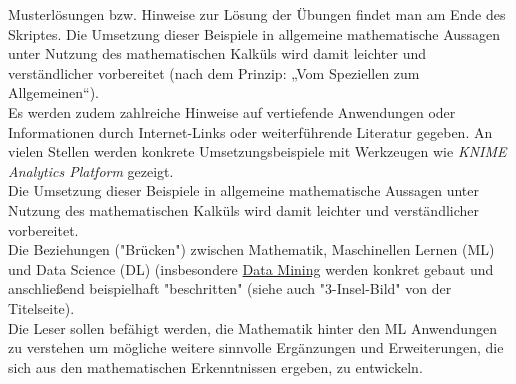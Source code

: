 \documentclass[12pt]{article}
\begin{document}
Musterlösungen bzw. Hinweise zur Lösung der Übungen findet man am Ende des Skriptes. Die Umsetzung dieser Beispiele in allgemeine mathematische Aussagen unter Nutzung des mathematischen Kalküls wird damit leichter und verständlicher vorbereitet (nach dem Prinzip: „Vom Speziellen zum Allgemeinen“). \\[0.1cm]
Es werden zudem zahlreiche Hinweise auf vertiefende Anwendungen oder Informationen durch Internet-Links oder weiterführende Literatur gegeben. An vielen Stellen werden konkrete Umsetzungsbeispiele mit Werkzeugen wie \textit{KNIME Analytics Platform} gezeigt. \\
Die Umsetzung dieser Beispiele in allgemeine mathematische Aussagen unter  Nutzung des mathematischen Kalküls wird damit leichter und verständlicher vorbereitet.\\[0.1cm]
%
Die Beziehungen ("Brücken") zwischen Mathematik, Maschinellen Lernen (ML) und Data Science (DL) (insbesondere \href{https://en.wikipedia.org/wiki/Data_mining}{Data Mining} werden konkret gebaut und anschließend beispielhaft "beschritten" (siehe auch "3-Insel-Bild" von der Titelseite).\\[0.2cm] 
%
Die Leser sollen befähigt werden, die Mathematik hinter den ML Anwendungen zu verstehen um mögliche weitere sinnvolle Ergänzungen und Erweiterungen, die sich aus den mathematischen Erkenntnissen ergeben, zu entwickeln.\\
\end{document}
